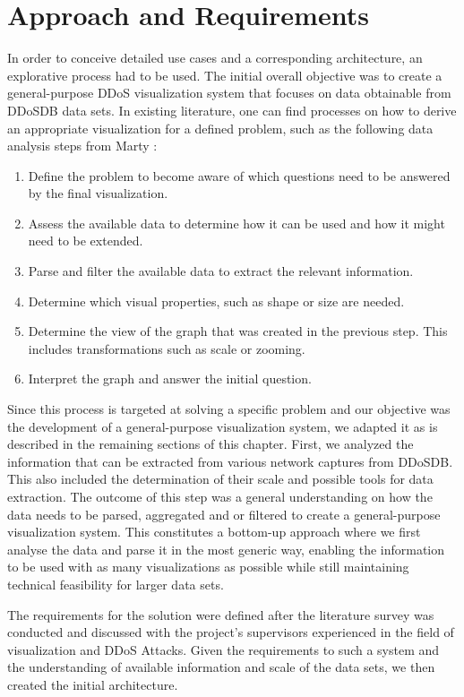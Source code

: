 
\chapter{Approach and Requirements}
In order to conceive detailed use cases and a corresponding architecture, an explorative process had to be used. The initial overall objective was to create a general-purpose DDoS visualization system that focuses on data obtainable from DDoSDB data sets. In existing literature, one can find processes on how to derive an appropriate visualization for a defined problem, such as the following data analysis steps from Marty \cite{appliedsecurityvisualization}:
\begin{enumerate}
    \item Define the problem to become aware of which questions need to be answered by the final visualization.
    \item Assess the available data to determine how it can be used and how it might need to be extended.
    \item Parse and filter the available data to extract the relevant information.
    \item Determine which visual properties, such as shape or size are needed.
    \item Determine the view of the graph that was created in the previous step. This includes transformations such as scale or zooming.
    \item Interpret the graph and answer the initial question.
\end{enumerate}

Since this process is targeted at solving a specific problem and our objective was the development of a general-purpose visualization system, we adapted it as is described in the remaining sections of this chapter. First, we analyzed the information that can be extracted from various network captures from DDoSDB. This also included the determination of their scale and possible tools for data extraction. The outcome of this step was a general understanding on how the data needs to be parsed, aggregated and or filtered to create a general-purpose visualization system. This constitutes a bottom-up approach where we first analyse the data and parse it in the most generic way,  enabling the information to be used with as many visualizations as possible while still maintaining technical feasibility for larger data sets.

The requirements for the solution were defined after the literature survey was conducted and discussed with the project's supervisors experienced in the field of visualization and DDoS Attacks.
Given the requirements to such a system and the understanding of available information and scale of the data sets, we then created the initial architecture.

